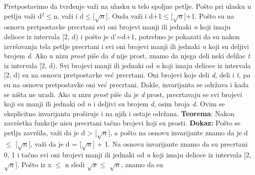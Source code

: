 \documentclass{article}
\begin{document}
\newline \hspace*{0.8cm}Pretpostavimo da tvrđenje važi na ulasku u telo spoljne petlje. Pošto \hspace*{0.8cm}pri ulasku u petlju važi d$^2$$\leq$n, važi i d$\leq$[$\sqrt{n}$]. Onda važi i
d+1$\leq$[$\sqrt{n}$]+1. \hspace*{0.8cm}Pošto su na osnovu pretpostavke precrtani svi oni brojevi manji ili jednaki
\hspace*{0.8cm}\textit{n} koji imaju delioce iz intervala [2, d) i pošto je d'=d+1, potrebno je
\hspace*{0.8cm}pokazati da su nakon izvršavanja tela petlje precrtani i svi oni brojevi
\hspace*{0.8cm}manji ili jednaki \textit{n} koji su deljivi brojem \textit{d}.
Ako u nizu \textit{prost} piše da \newline \hspace*{0.8cm}\textit{d} nije prost, znamo da
njega deli neki delilac \textit{t} iz intervala [2, d). Svi \hspace*{0.8cm}brojevi manji ili jednaki od \textit{n} koji imaju delioce iz intervala [2, d) su
\hspace*{0.8cm}na osnovu pretpostavke već precrtani. Oni brojevi koje deli \textit{d}, deli i
\textit{t}, pa \hspace*{0.8cm}su na osnovu pretpostavke oni već precrtani. Dakle, invarijanta se
održava \hspace*{0.8cm}i kada se ništa ne uradi.
Ako u nizu \textit{prost} piše da je \textit{d} prost, precrtavaju \hspace*{0.8cm}se svi brojevi koji su manji ili jednaki od \textit{n} i deljivi su brojem \textit{d}, osim broja
\hspace*{0.8cm}\textit{d}. Ovim se eksplicitno invarijanta proširuje i
na njih i ostaje održana.
\vspace{0.5cm} \newline \textbf{Teorema}: Nakon završetka funkcije nisu precrtani tačno brojevi koji su prosti.
\newline \hspace*{0.4cm}\textbf{Dokaz:}
\newline \hspace*{0.8cm}Pošto se petlja završila, važi da je d > [$\sqrt{n}$], a pošto na osnovu invarijante
\hspace*{0.8cm}znamo da je d $\leq$ [$\sqrt{n}$], važi da je d = [$\sqrt{n}$] + 1. Na osnovu invarijante
\hspace*{0.8cm}znamo da su precrtani 0, 1 i tačno svi oni brojevi manji ili jednaki od \textit{n} \hspace*{0.8cm}koji
imaju delioce iz intervala [2, $\sqrt{n}$]. Pošto iz x $\leq$ n sledi $\sqrt{x}$$\leq$ $\sqrt{n}$, \hspace*{0.8cm}znamo da su
\end{document}
